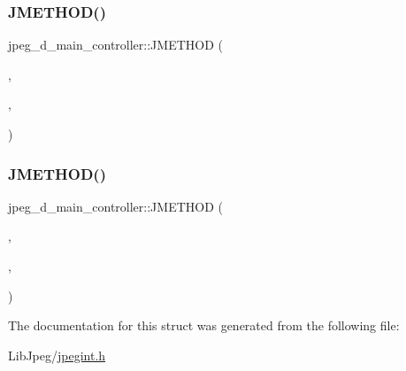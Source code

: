 \subsubsection{\texorpdfstring{JMETHOD()}{JMETHOD()}\hspace{0.1cm}{\footnotesize\ttfamily [1/2]}}
{\footnotesize\ttfamily jpeg\+\_\+d\+\_\+main\+\_\+controller\+::\+J\+M\+E\+T\+H\+OD (\begin{DoxyParamCaption}\item[{void}]{,  }\item[{\mbox{\hyperlink{jddctmgr_8c_a1964f006adb8fb80f57e455f6452aec1}{start\+\_\+pass}}}]{,  }\item[{(\mbox{\hyperlink{jpeglib_8h_a00c7d78af44bd26a901c791ccfc1e178}{j\+\_\+decompress\+\_\+ptr}} cinfo, \mbox{\hyperlink{jpegint_8h_a1f0803342372ac62b6903c399399c874}{J\+\_\+\+B\+U\+F\+\_\+\+M\+O\+DE}} pass\+\_\+mode)}]{ }\end{DoxyParamCaption})}

\mbox{\label{structjpeg__d__main__controller_affd488d3ef78b5080ec5b2a00c8198a5}} 
\subsubsection{\texorpdfstring{JMETHOD()}{JMETHOD()}\hspace{0.1cm}{\footnotesize\ttfamily [2/2]}}
{\footnotesize\ttfamily jpeg\+\_\+d\+\_\+main\+\_\+controller\+::\+J\+M\+E\+T\+H\+OD (\begin{DoxyParamCaption}\item[{void}]{,  }\item[{process\+\_\+data}]{,  }\item[{(\mbox{\hyperlink{jpeglib_8h_a00c7d78af44bd26a901c791ccfc1e178}{j\+\_\+decompress\+\_\+ptr}} cinfo, \mbox{\hyperlink{jpeglib_8h_ac9d5d1b829ed51769db69a37271a7e91}{J\+S\+A\+M\+P\+A\+R\+R\+AY}} \mbox{\hyperlink{jdct_8h_ad7e4660a191b1a791748dd44d5a7a0ec}{output\+\_\+buf}}, \mbox{\hyperlink{jmorecfg_8h_a04ed4674f6f1d0d50ec241531e38274f}{J\+D\+I\+M\+E\+N\+S\+I\+ON}} $\ast$out\+\_\+row\+\_\+ctr, \mbox{\hyperlink{jmorecfg_8h_a04ed4674f6f1d0d50ec241531e38274f}{J\+D\+I\+M\+E\+N\+S\+I\+ON}} out\+\_\+rows\+\_\+avail)}]{ }\end{DoxyParamCaption})}



The documentation for this struct was generated from the following file\+:\begin{DoxyCompactItemize}
\item 
Lib\+Jpeg/\mbox{\hyperlink{jpegint_8h}{jpegint.\+h}}\end{DoxyCompactItemize}
